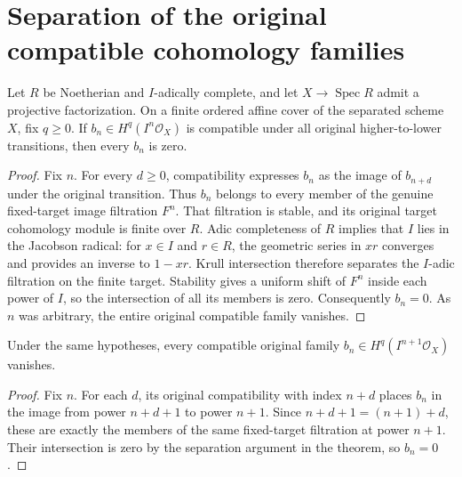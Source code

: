\section{Separation of the original compatible cohomology families}

\begin{theorem}
\label{thm:fc-formal-functions-compatible-cohomology-zero}
\leanok
{}
Let $R$ be Noetherian and $I$-adically complete, and let
$X\to\operatorname{Spec}R$ admit a projective factorization.  On a
finite ordered affine cover of the separated scheme $X$, fix $q\geq0$.
If $b_n\in H^q(I^n\mathcal O_X)$ is compatible under all original
higher-to-lower transitions, then every $b_n$ is zero.
\end{theorem}
\begin{proof}
Fix $n$.  For every $d\geq0$, compatibility expresses $b_n$ as the
image of $b_{n+d}$ under the original transition.  Thus $b_n$ belongs
to every member of the genuine fixed-target image filtration $F^n$.
That filtration is stable, and its original target cohomology module
is finite over $R$.  Adic completeness of $R$ implies that $I$ lies
in the Jacobson radical: for $x\in I$ and $r\in R$, the geometric
series in $xr$ converges and provides an inverse to $1-xr$.
Krull intersection therefore separates the $I$-adic filtration on
the finite target.  Stability gives a uniform shift of $F^n$ inside
each power of $I$, so the intersection of all its members is zero.
Consequently $b_n=0$.  As $n$ was arbitrary, the entire original
compatible family vanishes.
\end{proof}

\begin{corollary}
\label{cor:fc-formal-functions-positive-compatible-zero}
\leanok
{}
Under the same hypotheses, every compatible original family
$b_n\in H^q(I^{n+1}\mathcal O_X)$ vanishes.
\end{corollary}
\begin{proof}
Fix $n$.  For each $d$, its original compatibility with index $n+d$
places $b_n$ in the image from power $n+d+1$ to power $n+1$.
Since $n+d+1=(n+1)+d$, these are exactly the members of the same
fixed-target filtration at power $n+1$.  Their intersection is zero
by the separation argument in the theorem, so $b_n=0$.
\end{proof}
